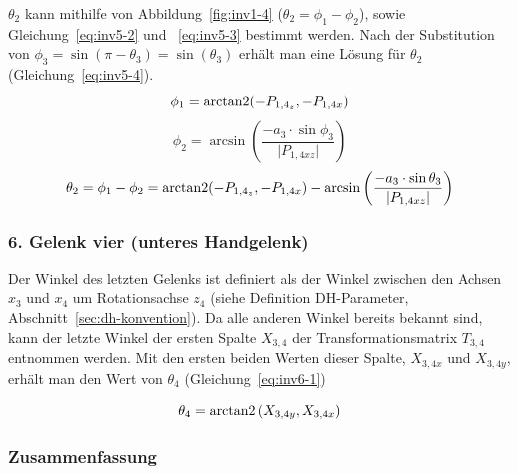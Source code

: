 $\theta_2$ kann mithilfe von Abbildung~\ref{fig:inv1-4} ($\theta_2 = \phi_1 - \phi_2$), sowie Gleichung~\ref{eq:inv5-2} und ~\ref{eq:inv5-3} bestimmt werden.
Nach der Substitution von $\phi_3 = \sin(\pi-\theta_3) = \sin(\theta_3)$ erhält man eine Lösung für $\theta_2$ (Gleichung~\ref{eq:inv5-4}).
\begin{equation}
    \phi_1 = \operatorname{arctan2}(-P_{1,4_z}, -P_{1,4x}) \label{eq:inv5-2}
\end{equation}
\begin{equation}
    \phi_2 = \arcsin\left( \frac{-a_3\cdot \sin \phi_3}{\lvert P_{1,4xz}\rvert} \right) \label{eq:inv5-3}
\end{equation}
\begin{equation}
    \theta_2 = \phi_1 - \phi_2 =
    \operatorname{arctan2}(-P_{1,4_z}, -P_{1,4x}) -
    \arcsin\left( \frac{-a_3\cdot \sin \theta_3}{\lvert P_{1,4xz}\rvert} \right)
    \label{eq:inv5-4}
\end{equation}

\subsubsection{6. Gelenk vier (unteres Handgelenk)}

Der Winkel des letzten Gelenks ist definiert als der Winkel zwischen den Achsen $x_3$ und $x_4$ um Rotationsachse $z_4$ (siehe Definition DH-Parameter, Abschnitt~\ref{sec:dh-konvention}).
Da alle anderen Winkel bereits bekannt sind, kann der letzte Winkel der ersten Spalte $X_{3,4}$ der Transformationsmatrix $T_{3,4}$ entnommen werden.
Mit den ersten beiden Werten dieser Spalte, $X_{3,4x}$ und $X_{3,4y}$, erhält man den Wert von $\theta_4$ (Gleichung~\ref{eq:inv6-1})

\begin{equation}
    \theta_4 = \operatorname{arctan2}\left( X_{3,4y}, X_{3,4x} \right)    \label{eq:inv6-1}
\end{equation}

\subsubsection{Zusammenfassung}

